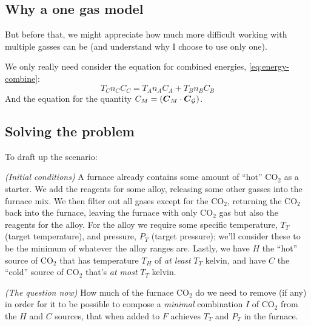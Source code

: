 \documentclass{article}
\newcommand{\CDiox}{\mathrm{CO}_2}
\begin{document}
\subsection{Why a one gas model}
\label{sec:why-one-gas}

But before that, we might appreciate how much more difficult working with multiple gasses can be
(and understand why I choose to use only one).

We only really need consider the equation for combined energies, \cref{eq:energy-combine}:
\[
    T_C n_C C_C = T_A n_A C_A+T_B n_B C_B
\]
And the equation for the quantity $C_M=(\boldsymbol{C}_M\cdot\boldsymbol{C}_{\operatorname{{\mathcal{G}}}})$.

\subsection{Solving the problem}

To draft up the scenario:

\emph{(Initial conditions)}
A furnace already contains some amount of ``hot'' $\CDiox$ as a starter. We add the reagents for
some alloy, releasing some other gasses into the furnace mix. We then filter out all gases except
for the $\CDiox$, returning the $\CDiox$ back into the furnace, leaving the furnace with only
$\CDiox$ gas but also the reagents for the alloy. For the alloy we require some specific
temperature, $T_T$ (target temperature), and pressure, $P_T$ (target pressure); we'll consider these
to be the minimum of whatever the alloy ranges are. Lastly, we have $H$ the ``hot'' source of
$\CDiox$ that has temperature $T_H$ of \emph{at least} $T_T$ kelvin, and have $C$ the ``cold''
source of $\CDiox$ that's \emph{at most} $T_T$ kelvin.

\emph{(The question now)}
How much of the furnace $\CDiox$ do we need to remove (if any) in order for
it to be possible to compose a \emph{minimal} combination $I$ of $\CDiox$ from the $H$ and $C$
sources, that when added to $F$ achieves $T_T$ and $P_T$ in the furnace.
\end{document}
